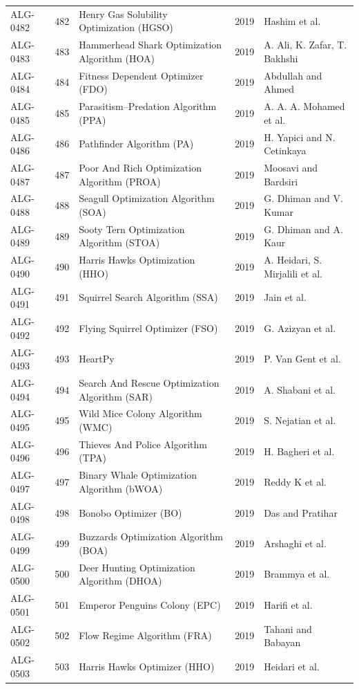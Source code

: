 \documentclass[8pt]{article}
\begin{document}
\begin{landscape}
\begin{longtable}{P{1.7cm}rP{10.0cm}rP{7.2cm}}
ALG-0482 & 482 & Henry Gas Solubility Optimization (HGSO) & 2019 & Hashim et al. \\
ALG-0483 & 483 & Hammerhead Shark Optimization Algorithm (HOA) & 2019 & A. Ali, K. Zafar, T. Bakhshi \\
ALG-0484 & 484 & Fitness Dependent Optimizer (FDO) & 2019 & Abdullah and Ahmed \\
ALG-0485 & 485 & Parasitism–Predation Algorithm (PPA) & 2019 & A. A. A. Mohamed et al. \\
ALG-0486 & 486 & Pathfinder Algorithm (PA) & 2019 & H. Yapici and N. Cetinkaya \\
ALG-0487 & 487 & Poor And Rich Optimization Algorithm (PROA) & 2019 & Moosavi and Bardsiri \\
ALG-0488 & 488 & Seagull Optimization Algorithm (SOA) & 2019 & G. Dhiman and V. Kumar \\
ALG-0489 & 489 & Sooty Tern Optimization Algorithm (STOA) & 2019 & G. Dhiman and A. Kaur \\
ALG-0490 & 490 & Harris Hawks Optimization (HHO) & 2019 & A. Heidari, S. Mirjalili et al. \\
ALG-0491 & 491 & Squirrel Search Algorithm (SSA) & 2019 & Jain et al. \\
ALG-0492 & 492 & Flying Squirrel Optimizer (FSO) & 2019 & G. Azizyan et al. \\
ALG-0493 & 493 & HeartPy & 2019 & P. Van Gent et al. \\
ALG-0494 & 494 & Search And Rescue Optimization Algorithm (SAR) & 2019 & A. Shabani et al. \\
ALG-0495 & 495 & Wild Mice Colony Algorithm (WMC) & 2019 & S. Nejatian et al. \\
ALG-0496 & 496 & Thieves And Police Algorithm (TPA) & 2019 & H. Bagheri et al. \\
ALG-0497 & 497 & Binary Whale Optimization Algorithm (bWOA) & 2019 & Reddy K et al. \\
ALG-0498 & 498 & Bonobo Optimizer (BO) & 2019 & Das and Pratihar \\
ALG-0499 & 499 & Buzzards Optimization Algorithm (BOA) & 2019 & Arshaghi et al. \\
ALG-0500 & 500 & Deer Hunting Optimization Algorithm (DHOA) & 2019 & Brammya et al. \\
ALG-0501 & 501 & Emperor Penguins Colony (EPC) & 2019 & Harifi et al. \\
ALG-0502 & 502 & Flow Regime Algorithm (FRA) & 2019 & Tahani and Babayan \\
ALG-0503 & 503 & Harris Hawks Optimizer (HHO) & 2019 & Heidari et al. \\

\end{longtable}
\end{landscape}
\end{document}
